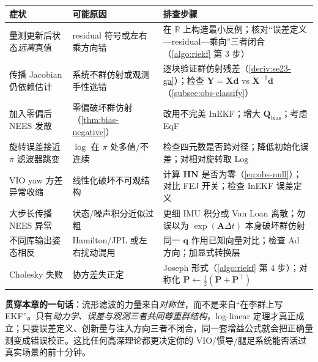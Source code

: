 \begin{table}[H]\centering\small
\begin{tabularx}{\linewidth}{LLL}
\toprule
症状 & 可能原因 & 排查步骤 \\
\midrule
量测更新后状态\emph{远离}真值 & residual 符号或左右乘方向错 & 在 $\mathbb{R}$ 上构造最小反例；核对“误差定义—residual—乘向”三者闭合（\cref{algo:riekf} 第 3 步） \\
传播 Jacobian 仍依赖估计 & 系统不群仿射或观测手性选错 & 逐块验证群仿射残差（\cref{deriv:se23-ga}）；检查 $\mathbf{Y}=\mathbf{X}\mathbf{d}$ vs $\mathbf{X}^{-1}\mathbf{d}$（\cref{subsec:obs-classify}） \\
加入零偏后 NEES 发散 & 零偏破坏群仿射（\cref{thm:bias-negative}） & 改用不完美 InEKF；增大 $\mathbf{Q}_{\text{bias}}$；考虑 EqF \\
旋转误差接近 $\pi$ 滤波器跳变 & $\log$ 在 $\pi$ 处多值/不连续 & 检查四元数是否跨对径；降低初始化误差；对相对旋转取 $\mathrm{Log}$ \\
VIO yaw 方差异常收缩 & 线性化破坏不可观结构 & 计算 $\mathbf{H}\mathbf{N}$ 是否为零（\cref{eq:obs-null}）；对比 FEJ 开关；检查 InEKF 误差定义 \\
大步长传播 NEES 异常 & 状态/噪声积分近似过粗 & 更细 IMU 积分或 Van Loan 离散；勿误以为 $\exp(\mathbf{A}\Delta t)$ 本身破坏群仿射 \\
不同库输出姿态相反 & Hamilton/JPL 或左右扰动混用 & 同一 $\mathbf{q}$ 作用已知向量对比；检查 $\mathrm{Ad}$ 方向；加显式转换层 \\
Cholesky 失败 & 协方差失正定 & Joseph 形式（\cref{algo:riekf} 第 4 步）；对称化 $\mathbf{P}\leftarrow\tfrac12(\mathbf{P}+\mathbf{P}^\top)$ \\
\bottomrule
\end{tabularx}
\end{table}

\begin{insight}
\textbf{贯穿本章的一句话}：流形滤波的力量来自\emph{对称性}，而不是来自“在李群上写 EKF”。只有\emph{动力学、误差与观测三者共同尊重群结构}，log-linear 定理才真正成立；只要误差定义、创新量与注入方向三者不闭合，同一套增益公式就会把正确量测变成错误校正。这比任何高深理论都更决定你的 VIO/惯导/腿足系统能否活过真实场景的前十分钟。
\end{insight}
